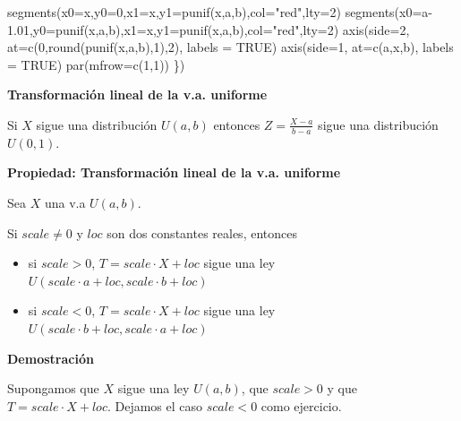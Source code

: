 \documentclass[
  letterpaper,
  DIV=11,
  numbers=noendperiod]{scrreprt}
\newenvironment{Shaded}{\begin{snugshade}}{\end{snugshade}}
\newcommand{\AttributeTok}[1]{\textcolor[rgb]{0.40,0.45,0.13}{#1}}
\newcommand{\ConstantTok}[1]{\textcolor[rgb]{0.56,0.35,0.01}{#1}}
\newcommand{\DecValTok}[1]{\textcolor[rgb]{0.68,0.00,0.00}{#1}}
\newcommand{\FloatTok}[1]{\textcolor[rgb]{0.68,0.00,0.00}{#1}}
\newcommand{\FunctionTok}[1]{\textcolor[rgb]{0.28,0.35,0.67}{#1}}
\newcommand{\NormalTok}[1]{\textcolor[rgb]{0.00,0.23,0.31}{#1}}
\newcommand{\StringTok}[1]{\textcolor[rgb]{0.13,0.47,0.30}{#1}}
\providecommand{\tightlist}{%
  \setlength{\itemsep}{0pt}\setlength{\parskip}{0pt}}\usepackage{longtable,booktabs,array}
\begin{document}
\begin{Shaded}
\begin{Highlighting}[]
  \FunctionTok{segments}\NormalTok{(}\AttributeTok{x0=}\NormalTok{x,}\AttributeTok{y0=}\DecValTok{0}\NormalTok{,}\AttributeTok{x1=}\NormalTok{x,}\AttributeTok{y1=}\FunctionTok{punif}\NormalTok{(x,a,b),}\AttributeTok{col=}\StringTok{"red"}\NormalTok{,}\AttributeTok{lty=}\DecValTok{2}\NormalTok{)}
  \FunctionTok{segments}\NormalTok{(}\AttributeTok{x0=}\NormalTok{a}\FloatTok{{-}1.01}\NormalTok{,}\AttributeTok{y0=}\FunctionTok{punif}\NormalTok{(x,a,b),}\AttributeTok{x1=}\NormalTok{x,}\AttributeTok{y1=}\FunctionTok{punif}\NormalTok{(x,a,b),}\AttributeTok{col=}\StringTok{"red"}\NormalTok{,}\AttributeTok{lty=}\DecValTok{2}\NormalTok{)}
  \FunctionTok{axis}\NormalTok{(}\AttributeTok{side=}\DecValTok{2}\NormalTok{, }\AttributeTok{at=}\FunctionTok{c}\NormalTok{(}\DecValTok{0}\NormalTok{,}\FunctionTok{round}\NormalTok{(}\FunctionTok{punif}\NormalTok{(x,a,b),}\DecValTok{1}\NormalTok{),}\DecValTok{2}\NormalTok{), }\AttributeTok{labels =} \ConstantTok{TRUE}\NormalTok{)}
  \FunctionTok{axis}\NormalTok{(}\AttributeTok{side=}\DecValTok{1}\NormalTok{, }\AttributeTok{at=}\FunctionTok{c}\NormalTok{(a,x,b), }\AttributeTok{labels =} \ConstantTok{TRUE}\NormalTok{)}
  \FunctionTok{par}\NormalTok{(}\AttributeTok{mfrow=}\FunctionTok{c}\NormalTok{(}\DecValTok{1}\NormalTok{,}\DecValTok{1}\NormalTok{))}
\NormalTok{\})}
\end{Highlighting}
\end{Shaded}

\textbf{Transformación lineal de la v.a. uniforme}

Si \(X\) sigue una distribución \(U(a,b)\) entonces
\(Z=\frac{X-a}{b-a}\) sigue una distribución \(U(0,1)\).

\textbf{Propiedad: Transformación lineal de la v.a. uniforme}

Sea \(X\) una v.a \(U(a,b)\).

Si \(scale\not=0\) y \(loc\) son dos constantes reales, entonces

\begin{itemize}
\tightlist
\item
  si \(scale>0\), \(T=scale\cdot X+loc\) sigue una ley
  \(U(scale\cdot a +loc,scale\cdot b +loc)\)\\
\item
  si \(scale<0\), \(T=scale\cdot X+loc\) sigue una ley
  \(U(scale\cdot b +loc,scale\cdot a +loc)\)
\end{itemize}

\textbf{Demostración}

Supongamos que \(X\) sigue una ley \(U(a,b)\), que \(scale>0\) y que
\(T=scale\cdot X+loc\). Dejamos el caso \(scale<0\) como ejercicio.
\end{document}
